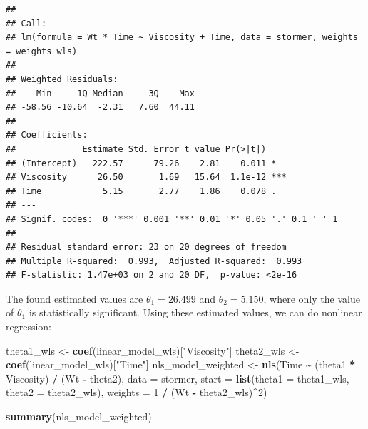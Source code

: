 \documentclass[
  11pt,
]{article}
\newenvironment{Shaded}{\begin{snugshade}}{\end{snugshade}}
\newcommand{\AttributeTok}[1]{\textcolor[rgb]{0.13,0.29,0.53}{#1}}
\newcommand{\DecValTok}[1]{\textcolor[rgb]{0.00,0.00,0.81}{#1}}
\newcommand{\FunctionTok}[1]{\textcolor[rgb]{0.13,0.29,0.53}{\textbf{#1}}}
\newcommand{\NormalTok}[1]{#1}
\newcommand{\OtherTok}[1]{\textcolor[rgb]{0.56,0.35,0.01}{#1}}
\newcommand{\SpecialCharTok}[1]{\textcolor[rgb]{0.81,0.36,0.00}{\textbf{#1}}}
\newcommand{\StringTok}[1]{\textcolor[rgb]{0.31,0.60,0.02}{#1}}
\begin{document}
\begin{Shaded}
\end{Shaded}

\begin{verbatim}
## 
## Call:
## lm(formula = Wt * Time ~ Viscosity + Time, data = stormer, weights = weights_wls)
## 
## Weighted Residuals:
##    Min     1Q Median     3Q    Max 
## -58.56 -10.64  -2.31   7.60  44.11 
## 
## Coefficients:
##             Estimate Std. Error t value Pr(>|t|)    
## (Intercept)   222.57      79.26    2.81    0.011 *  
## Viscosity      26.50       1.69   15.64  1.1e-12 ***
## Time            5.15       2.77    1.86    0.078 .  
## ---
## Signif. codes:  0 '***' 0.001 '**' 0.01 '*' 0.05 '.' 0.1 ' ' 1
## 
## Residual standard error: 23 on 20 degrees of freedom
## Multiple R-squared:  0.993,  Adjusted R-squared:  0.993 
## F-statistic: 1.47e+03 on 2 and 20 DF,  p-value: <2e-16
\end{verbatim}

The found estimated values are \(\theta_1 = 26.499\) and
\(\theta_2 = 5.150\), where only the value of \(\theta_1\) is
statistically significant. Using these estimated values, we can do
nonlinear regression:

\begin{Shaded}
\begin{Highlighting}[]
\NormalTok{theta1\_wls }\OtherTok{\textless{}{-}} \FunctionTok{coef}\NormalTok{(linear\_model\_wls)[}\StringTok{"Viscosity"}\NormalTok{]}
\NormalTok{theta2\_wls }\OtherTok{\textless{}{-}} \FunctionTok{coef}\NormalTok{(linear\_model\_wls)[}\StringTok{"Time"}\NormalTok{]}
\NormalTok{nls\_model\_weighted }\OtherTok{\textless{}{-}} \FunctionTok{nls}\NormalTok{(Time }\SpecialCharTok{\textasciitilde{}}\NormalTok{ (theta1 }\SpecialCharTok{*}\NormalTok{ Viscosity) }\SpecialCharTok{/}\NormalTok{ (Wt }\SpecialCharTok{{-}}\NormalTok{ theta2), }
                          \AttributeTok{data =}\NormalTok{ stormer,}
                          \AttributeTok{start =} \FunctionTok{list}\NormalTok{(}\AttributeTok{theta1 =}\NormalTok{ theta1\_wls, }\AttributeTok{theta2 =}\NormalTok{ theta2\_wls),}
                          \AttributeTok{weights =} \DecValTok{1} \SpecialCharTok{/}\NormalTok{ (Wt }\SpecialCharTok{{-}}\NormalTok{ theta2\_wls)}\SpecialCharTok{\^{}}\DecValTok{2}\NormalTok{)}

\FunctionTok{summary}\NormalTok{(nls\_model\_weighted)}
\end{Highlighting}
\end{Shaded}
\end{document}
